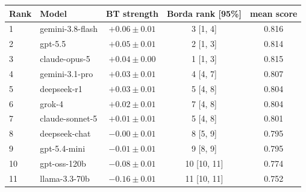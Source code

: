 \begin{tabular}{llccc}
\toprule
Rank & Model & BT strength & Borda rank [95\%] & mean score \\
\midrule
1 & gemini-3.8-flash & $+0.06 \pm 0.01$ & 3 [1, 4] & 0.816 \\
2 & gpt-5.5 & $+0.05 \pm 0.01$ & 2 [1, 3] & 0.814 \\
3 & claude-opus-5 & $+0.04 \pm 0.00$ & 1 [1, 3] & 0.815 \\
4 & gemini-3.1-pro & $+0.03 \pm 0.01$ & 4 [4, 7] & 0.807 \\
5 & deepseek-r1 & $+0.03 \pm 0.01$ & 5 [4, 8] & 0.804 \\
6 & grok-4 & $+0.02 \pm 0.01$ & 7 [4, 8] & 0.804 \\
7 & claude-sonnet-5 & $+0.01 \pm 0.01$ & 5 [4, 8] & 0.801 \\
8 & deepseek-chat & $-0.00 \pm 0.01$ & 8 [5, 9] & 0.795 \\
9 & gpt-5.4-mini & $-0.01 \pm 0.01$ & 9 [8, 9] & 0.795 \\
10 & gpt-oss-120b & $-0.08 \pm 0.01$ & 10 [10, 11] & 0.774 \\
11 & llama-3.3-70b & $-0.16 \pm 0.01$ & 11 [10, 11] & 0.752 \\
\bottomrule
\end{tabular}
